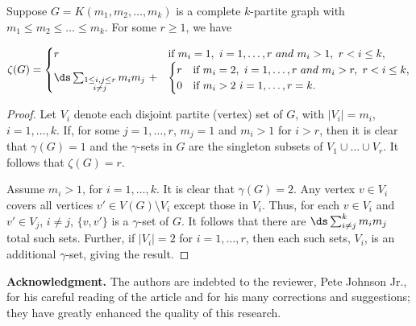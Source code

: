 \documentclass[twoside,12pt]{article}
\begin{document}
\begin{theorem}
Suppose  $G=K(m_1,m_2,\ldots, m_k)$ is a complete $k$-partite graph with $m_1\le m_2 \le \ldots \le m_k$. For some $r\ge 1$, we have

$\zeta(G)=\begin{cases} 
r &  \text{if} \  m_i=1,\  i=1, \ldots, r  \ and \  m_i>1, \ r<i\le k,\\
\ds \sum_{\substack {1\le i,j \le r \\ i\ne j}}m_im_j \ + &\begin{cases}
r & \text{if} \ m_i=2, \ i=1, \ldots, r  \ and \  m_i>r, \ r<i\le k, \\
0 & \text{if} \ m_i>2 \ i=1, \ldots, r=k.
\end{cases}
\end{cases}$




\end{theorem}
\begin{proof}
Let $V_i$ denote each disjoint partite (vertex) set of $G$, with $|V_i|=m_i$, $i=1,\ldots, k$. If, for some $j=1,\ldots, r$, $m_j=1$ and $m_i>1$ for $i>r$, then it is clear that $\gamma(G)=1$ and the $\gamma$-sets in $G$ are the singleton subsets of $V_1\cup\ldots \cup V_r$. It follows that $\zeta(G)=r$. %

Assume $m_i>1$, for $i=1,\ldots, k$. It is clear that $\gamma(G)=2$. Any vertex $v\in V_i$ covers all vertices $v'\in V(G)\setminus V_i$ except those in $V_i$. Thus, for each $v\in V_i$ and $v'\in V_j$, $i\ne j$, $\{v,v'\}$ is a $\gamma$-set of $G$. It follows that there are $\ds \sum_{i\ne j}^{{k}}m_im_j$ total such sets. Further, if  $|V_i|=2$ for $i=1,\ldots, r$, then each such sets, $V_i$, is an additional $\gamma$-set, giving the result.
\end{proof}


 {\bf Acknowledgment.}
The authors are indebted to the reviewer, Pete Johnson Jr., for his careful reading of the article and for his many corrections and suggestions; they have greatly enhanced the quality of this research.
\end{document}
